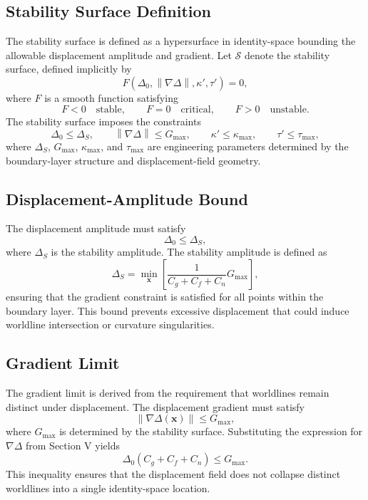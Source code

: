 \documentclass[aip,adv,reprint,floatfix]{revtex4-2}
\begin{document}
\subsection{Stability Surface Definition}

The stability surface is defined as a hypersurface in identity-space bounding the allowable displacement amplitude and gradient. Let $\mathcal{S}$ denote the stability surface, defined implicitly by
\begin{equation}
F\left( \Delta_0, \left\| \nabla \Delta \right\|, \kappa', \tau' \right) = 0,
\end{equation}
where $F$ is a smooth function satisfying
\begin{equation}
F < 0 \quad \text{stable}, \qquad F = 0 \quad \text{critical}, \qquad F > 0 \quad \text{unstable}.
\end{equation}
The stability surface imposes the constraints
\begin{equation}
\Delta_0 \leq \Delta_S,
\qquad
\left\| \nabla \Delta \right\| \leq G_{\max},
\qquad
\kappa' \leq \kappa_{\max},
\qquad
\tau' \leq \tau_{\max},
\end{equation}
where $\Delta_S$, $G_{\max}$, $\kappa_{\max}$, and $\tau_{\max}$ are engineering parameters determined by the boundary-layer structure and displacement-field geometry.

\subsection{Displacement-Amplitude Bound}

The displacement amplitude must satisfy
\begin{equation}
\Delta_0 \leq \Delta_S,
\end{equation}
where $\Delta_S$ is the stability amplitude. The stability amplitude is defined as
\begin{equation}
\Delta_S = \min_{\mathbf{x}} \left[ \frac{1}{C_g + C_f + C_n} G_{\max} \right],
\end{equation}
ensuring that the gradient constraint is satisfied for all points within the boundary layer. This bound prevents excessive displacement that could induce worldline intersection or curvature singularities.

\subsection{Gradient Limit}

The gradient limit is derived from the requirement that worldlines remain distinct under displacement. The displacement gradient must satisfy
\begin{equation}
\left\| \nabla \Delta(\mathbf{x}) \right\| \leq G_{\max},
\end{equation}
where $G_{\max}$ is determined by the stability surface. Substituting the expression for $\nabla \Delta$ from Section V yields
\begin{equation}
\Delta_0 \left( C_g + C_f + C_n \right) \leq G_{\max}.
\end{equation}
This inequality ensures that the displacement field does not collapse distinct worldlines into a single identity-space location.
\end{document}

